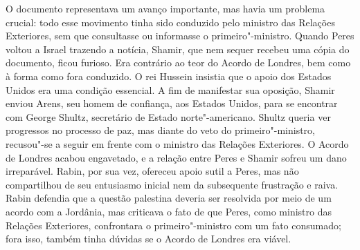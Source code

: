 
O documento representava um avanço importante, mas havia um problema
crucial: todo esse movimento tinha sido conduzido pelo ministro das
Relações Exteriores, sem que consultasse ou informasse o primeiro"-ministro.
Quando Peres voltou a Israel trazendo a notícia, Shamir, que nem sequer
recebeu uma cópia do documento, ficou furioso. Era contrário ao teor do
Acordo de Londres, bem como à forma como fora conduzido. O rei Hussein
insistia que o apoio dos Estados Unidos era uma condição essencial. A
fim de manifestar sua oposição, Shamir enviou Arens, seu homem de
confiança, aos Estados Unidos, para se encontrar com George Shultz,
secretário de Estado norte"-americano. Shultz queria ver progressos no
processo de paz, mas diante do veto do primeiro"-ministro, recusou"-se a
seguir em frente com o ministro das Relações Exteriores. O Acordo de
Londres acabou engavetado, e a relação entre Peres e Shamir sofreu um
dano irreparável. Rabin, por sua vez, ofereceu apoio sutil a Peres, mas
não compartilhou de seu entusiasmo inicial nem da subsequente frustração
e raiva. Rabin defendia que a questão palestina deveria ser resolvida
por meio de um acordo com a Jordânia, mas criticava o fato de que Peres,
como ministro das Relações Exteriores, confrontara o primeiro"-ministro
com um fato consumado; fora isso, também tinha dúvidas se o Acordo de
Londres era viável.


